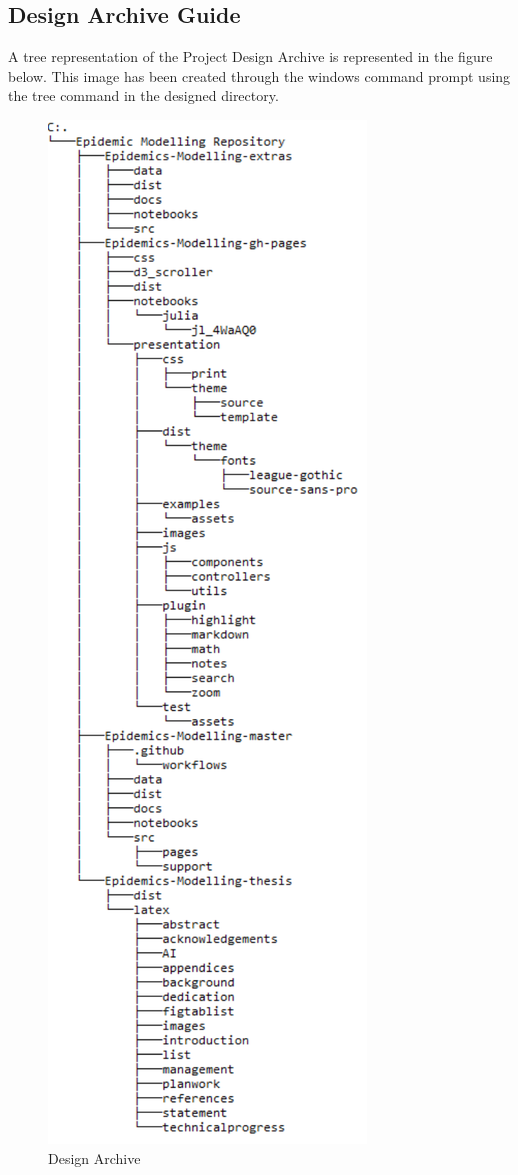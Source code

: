 \begin{appendices}
\section{Design Archive Guide}
\label{archive}
A tree representation of the Project Design Archive is represented in the figure below. This image has been created through the windows command prompt using the tree command in the designed directory.
\begin{figure}[ht!]%
    \centering
    \includegraphics[page=1,scale=0.76]{latex/images/archive.pdf}
    \vspace*{-2mm}
    \caption{Design Archive}%
\end{figure}


\end{appendices}
